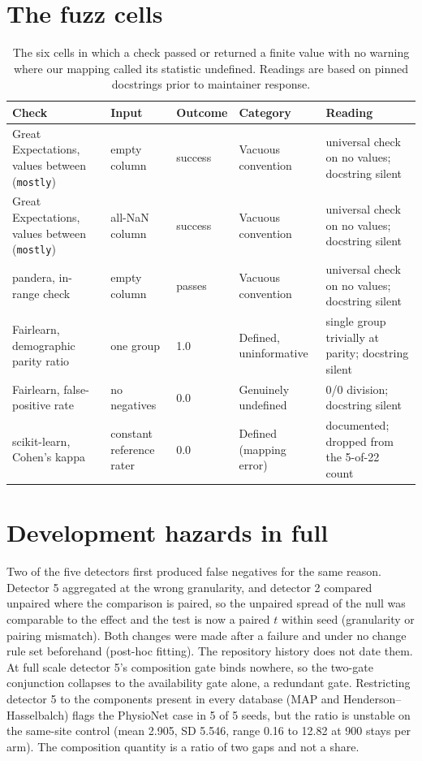 \documentclass[10pt]{article}
\theoremstyle{definition}
\begin{document}
\section{The fuzz cells}
\label{apd:fuzzcells}
\begin{table}[h]
\centering\footnotesize
\begin{tabular}{@{}p{3.4cm}p{2.1cm}p{1.2cm}p{2.2cm}p{3.3cm}@{}}
\toprule
Check & Input & Outcome & Category & Reading\\
\midrule
Great Expectations, values between (\texttt{mostly}) & empty column & success & Vacuous convention & universal check on no values; docstring silent\\
Great Expectations, values between (\texttt{mostly}) & all-NaN column & success & Vacuous convention & universal check on no values; docstring silent\\
pandera, in-range check & empty column & passes & Vacuous convention & universal check on no values; docstring silent\\
Fairlearn, demographic parity ratio & one group & 1.0 & Defined, uninformative & single group trivially at parity; docstring silent\\
Fairlearn, false-positive rate & no negatives & 0.0 & Genuinely undefined & 0/0 division; docstring silent\\
scikit-learn, Cohen's kappa & constant reference rater & 0.0 & Defined (mapping error) & documented; dropped from the 5-of-22 count\\
\bottomrule
\end{tabular}
\caption{The six cells in which a check passed or returned a finite value with no warning where our mapping called its statistic undefined. Readings are based on pinned docstrings prior to maintainer response.}
\label{tab:fuzzcells}
\end{table}

\section{Development hazards in full}
\label{apd:hazards}
Two of the five detectors first produced false negatives for the same reason. Detector 5 aggregated at the wrong granularity, and detector 2 compared unpaired where the comparison is paired, so the unpaired spread of the null was comparable to the effect and the test is now a paired $t$ within seed (granularity or pairing mismatch). Both changes were made after a failure and under no change rule set beforehand (post-hoc fitting). The repository history does not date them. At full scale detector 5's composition gate binds nowhere, so the two-gate conjunction collapses to the availability gate alone, a redundant gate. Restricting detector 5 to the components present in every database (MAP and Henderson--Hasselbalch) flags the PhysioNet case in 5 of 5 seeds, but the ratio is unstable on the same-site control (mean 2.905, SD 5.546, range 0.16 to 12.82 at 900 stays per arm). The composition quantity is a ratio of two gaps and not a share.
\end{document}
